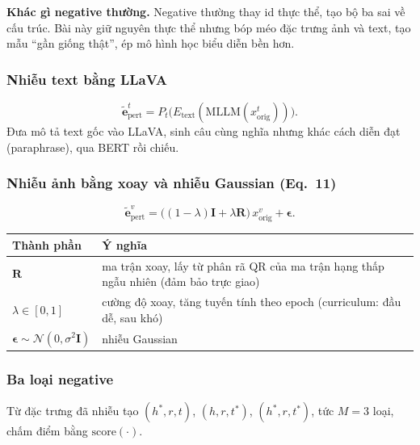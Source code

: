 \documentclass[11pt,a4paper]{article}
\newcommand{\score}{\mathrm{score}}
\begin{document}
\textbf{Khác gì negative thường.} Negative thường thay id thực thể, tạo bộ ba sai về cấu trúc. Bài này giữ nguyên thực thể nhưng bóp méo đặc trưng ảnh và text, tạo mẫu ``gần giống thật'', ép mô hình học biểu diễn bền hơn.

\subsubsection{Nhiễu text bằng LLaVA}

\begin{equation*}
\tilde{\mathbf{e}}^{t}_{\mathrm{pert}} = P_t\big(E_{\mathrm{text}}(\mathrm{MLLM}(x^{t}_{\mathrm{orig}}))\big).
\end{equation*}
Đưa mô tả text gốc vào LLaVA, sinh câu cùng nghĩa nhưng khác cách diễn đạt (paraphrase), qua BERT rồi chiếu.

\subsubsection{Nhiễu ảnh bằng xoay và nhiễu Gaussian (Eq.~11)}

\begin{equation}
\tilde{\mathbf{e}}^{v}_{\mathrm{pert}} = \big((1 - \lambda)\mathbf{I} + \lambda\mathbf{R}\big)\,x^{v}_{\mathrm{orig}} + \boldsymbol{\epsilon}.
\label{eq:vis}
\end{equation}

\begin{table}[H]
\centering\small
\begin{tabular}{@{}lp{10cm}@{}}
\toprule
Thành phần & Ý nghĩa\\
\midrule
$\mathbf{R}$ & ma trận xoay, lấy từ phân rã QR của ma trận hạng thấp ngẫu nhiên (đảm bảo trực giao)\\
$\lambda \in [0,1]$ & cường độ xoay, tăng tuyến tính theo epoch (curriculum: đầu dễ, sau khó)\\
$\boldsymbol{\epsilon} \sim \mathcal{N}(0, \sigma^2 \mathbf{I})$ & nhiễu Gaussian\\
\bottomrule
\end{tabular}
\end{table}

\subsubsection{Ba loại negative}

Từ đặc trưng đã nhiễu tạo $(h^*, r, t)$, $(h, r, t^*)$, $(h^*, r, t^*)$, tức $M = 3$ loại, chấm điểm bằng $\score(\cdot)$.
\end{document}
